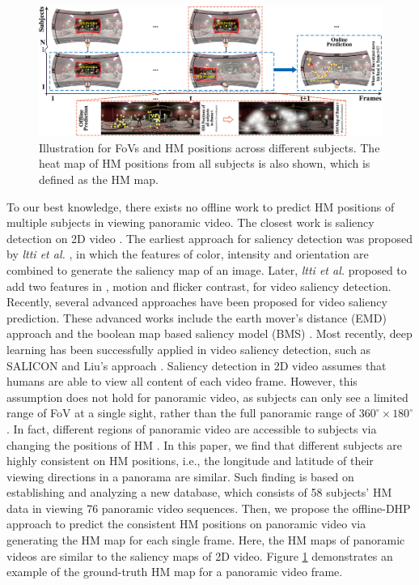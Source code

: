 \documentclass[10pt,journal,compsoc]{IEEEtran}
\begin{document}
\begin{figure}
	\begin{center}
		\centerline{\includegraphics[width=1.6\columnwidth]{figures/introduction/fig_one}}
		\caption{Illustration for FoVs and HM positions across different subjects. The heat map of HM positions from all subjects is also shown, which is defined as the HM map.}
		\label{fig-one}
	\end{center}
\end{figure}

To our best knowledge, there exists no offline work to predict HM positions of multiple subjects in viewing panoramic video. The closest work is saliency detection on 2D video \cite{borji2013state}. The earliest approach for saliency detection was proposed by \textit{ltti et al.} \cite{itti1998model}, in which the features of color, intensity and orientation are combined to generate the saliency map of an image. Later, \textit{ltti et al.} \cite{itti2004automatic} proposed to add two features in \cite{itti1998model}, motion and flicker contrast, for video saliency detection. Recently, several advanced approaches have been proposed for video saliency prediction. These advanced works include  the earth mover's distance (EMD) approach \cite{lin2013visual} and the boolean map based saliency model (BMS) \cite{zhang2016exploiting}.
Most recently, deep learning has been successfully applied in video saliency detection,
such as SALICON \cite{huang2015salicon} and Liu's approach \cite{Liu2017cvpr}.
Saliency detection in 2D video assumes that humans are able to view all content of each video frame.
However, this assumption does not hold for panoramic video, as subjects can only see a limited range of FoV at a single sight, rather than the full panoramic range of $360^{\circ} \times 180^{\circ}$.
In fact, different regions of panoramic video are accessible to subjects via changing the positions of HM \cite{lowe2015visualization}.
In this paper, we find that different subjects are highly consistent on HM positions, i.e., the longitude and latitude of their viewing directions in a panorama are similar.
Such finding is based on establishing and analyzing a new database, which consists of 58 subjects' HM data in viewing 76 panoramic video sequences.
Then, we propose the offline-DHP approach to predict the consistent HM positions on panoramic video via generating the HM map for each single frame.
Here, the HM maps of panoramic videos are similar to the saliency maps of 2D video.
Figure \ref{fig-one} demonstrates an example of the ground-truth HM map for a panoramic video frame.
\end{document}
